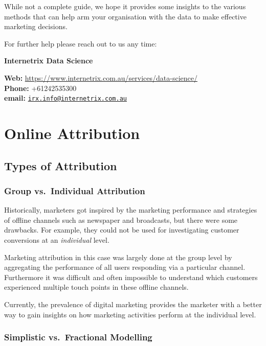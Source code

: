 \documentclass[]{book}
\begin{document}
While not a complete guide, we hope it provides some insights to the various
methods that can help arm your organisation with the data to make effective
marketing decisions.

For further help please reach out to us any time:

\textbf{Internetrix Data Science}

\textbf{Web:} \url{https://www.internetrix.com.au/services/data-science/}\\
\textbf{Phone:} +61242535300\\
\textbf{email:} \href{mailto:irx.info@internetrix.com.au}{\nolinkurl{irx.info@internetrix.com.au}}

\hypertarget{part-online-attribution}{%
\part{Online Attribution}\label{part-online-attribution}}

\hypertarget{types-of-attribution}{%
\chapter{Types of Attribution}\label{types-of-attribution}}

\hypertarget{group-vs.individual-attribution}{%
\section{Group vs.~Individual Attribution}\label{group-vs.individual-attribution}}

Historically, marketers got inspired by the marketing performance and strategies
of offline channels such as newspaper and broadcasts, but there were some
drawbacks. For example, they could not be used for investigating customer
conversions at an \emph{individual} level.

Marketing attribution in this case was largely done at the group level by
aggregating the performance of all users responding via a particular
channel. Furthermore it was difficult and often impossible to understand which
customers experienced multiple touch points in these offline channels.

Currently, the prevalence of digital marketing provides the marketer with a
better way to gain insights on how marketing activities perform at the individual
level.

\hypertarget{simplistic-vs.fractional-modelling}{%
\section{Simplistic vs.~Fractional Modelling}\label{simplistic-vs.fractional-modelling}}
\end{document}
